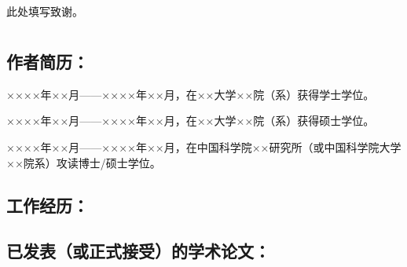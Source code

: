 
{
    \chapter[\acknowledgeNameMark]{\acknowledgeName}
}
\pagestyle{plain}

此处填写致谢。

\lipsum[1-3]


\cleardoublepage[plain]

{
    \chapter[\achievementNameMark]{\achievementName}
}
\pagestyle{plain}

\section*{作者简历：}
××××年××月——××××年××月，在××大学××院（系）获得学士学位。

××××年××月——××××年××月，在××大学××院（系）获得硕士学位。

××××年××月——××××年××月，在中国科学院××研究所（或中国科学院大学××院系）攻读博士/硕士学位。

\section*{工作经历：}

\lipsum[1-2]

\section*{已发表（或正式接受）的学术论文：}

